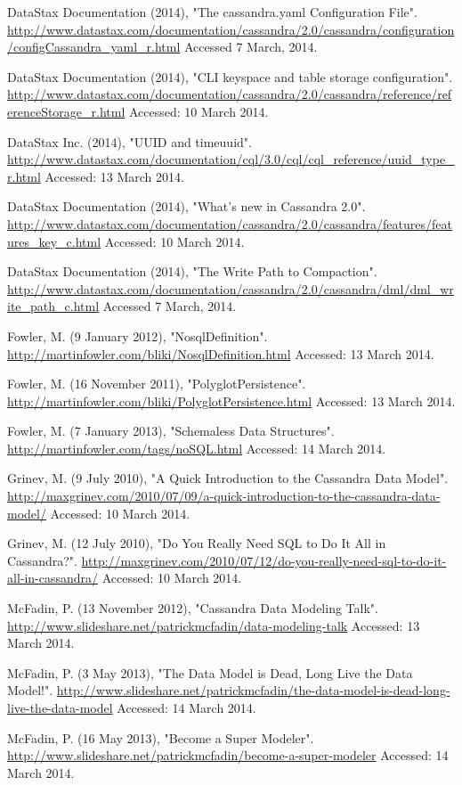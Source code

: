 \documentclass[letterpaper]{article}
\begin{document}
DataStax Documentation (2014), "The cassandra.yaml Configuration File".
\url{http://www.datastax.com/documentation/cassandra/2.0/cassandra/configuration/configCassandra_yaml_r.html}
Accessed 7 March, 2014.  

DataStax Documentation (2014), "CLI keyspace and table storage configuration".
\url{http://www.datastax.com/documentation/cassandra/2.0/cassandra/reference/referenceStorage_r.html}
Accessed: 10 March 2014.

DataStax Inc. (2014), "UUID and timeuuid".
\url{http://www.datastax.com/documentation/cql/3.0/cql/cql_reference/uuid_type_r.html}
Accessed: 13 March 2014.

DataStax Documentation (2014), "What's new in Cassandra 2.0".
\url{http://www.datastax.com/documentation/cassandra/2.0/cassandra/features/features_key_c.html}
Accessed: 10 March 2014.

DataStax Documentation (2014), "The Write Path to Compaction".
\url{http://www.datastax.com/documentation/cassandra/2.0/cassandra/dml/dml_write_path_c.html}
Accessed 7 March, 2014.

Fowler, M. (9 January 2012), "NosqlDefinition".
\url{http://martinfowler.com/bliki/NosqlDefinition.html}
Accessed: 13 March 2014.

Fowler, M. (16 November 2011), "PolyglotPersistence".
\url{http://martinfowler.com/bliki/PolyglotPersistence.html}
Accessed: 13 March 2014.

Fowler, M. (7 January 2013), "Schemaless Data Structures".
\url{http://martinfowler.com/tags/noSQL.html}
Accessed: 14 March 2014.

Grinev, M. (9 July 2010), "A Quick Introduction to the Cassandra Data Model".
\url{http://maxgrinev.com/2010/07/09/a-quick-introduction-to-the-cassandra-data-model/}
Accessed: 10 March 2014.

Grinev, M. (12 July 2010), "Do You Really Need SQL to Do It All in Cassandra?".
\url{ http://maxgrinev.com/2010/07/12/do-you-really-need-sql-to-do-it-all-in-cassandra/}
Accessed: 10 March 2014.

McFadin, P. (13 November 2012), "Cassandra Data Modeling Talk".
\url{http://www.slideshare.net/patrickmcfadin/data-modeling-talk}
Accessed: 13 March 2014.

McFadin, P. (3 May 2013), "The Data Model is Dead, Long Live the Data Model!".
\url{http://www.slideshare.net/patrickmcfadin/the-data-model-is-dead-long-live-the-data-model}
Accessed: 14 March 2014.

McFadin, P. (16 May 2013), "Become a Super Modeler".
\url{http://www.slideshare.net/patrickmcfadin/become-a-super-modeler}
Accessed: 14 March 2014.
\end{document}
